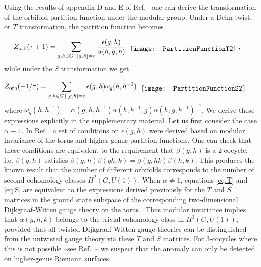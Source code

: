 \documentclass[aps,pra,twocolumn,superscriptaddress,10pt,article,nofootinbib,showpacs]{revtex4-1}
\begin{document}
Using the results of appendix D and E of Ref.~\cite{SPTpaper} one can derive the transformation of the orbifold partition function under the modular group. Under a Dehn twist, or $T$ transformation, the partition function becomes

\begin{align}\label{eq:T}
Z_{\text{orb}}(\tau +1)=\sum_{g,h\in G\, |\,[g,h]=e} \frac{\epsilon(g,h)}{\alpha(h,g,h)}
 & \hspace{2 mm} \raisebox{-.4\height}{\texttt{[image: PartitionFunctionT2]}}\; ,
\end{align}
while under the $S$ transformation we get

\begin{align}\label{eq:S}
Z_{\text{orb}}(-1/\tau)=\sum_{g,h\in G\, |\,[g,h]=e} \epsilon(g,h)\omega_g(h,h^{-1})
 & \hspace{2 mm} \raisebox{-.4\height}{\texttt{[image: PartitionFunctionS2]}}\; ,
\end{align}
where $\omega_g(h,h^{-1})=\alpha(g,h,h^{-1})\alpha(h,h^{-1},g)\alpha(h,g,h^{-1})^{-1}$. We derive these expressions explicitly in the supplementary material. Let us first consider the case $\alpha \equiv 1$. In Ref.~\cite{Vafa1} a set of conditions on $\epsilon(g,h)$ were derived based on modular invariance of the torus and higher genus partition functions. One can check that these conditions are equivalent to the requirement that $\beta(g,h)$ is a 2-cocycle, i.e. $\beta(g,h)$ satisfies $\beta(g,h)\beta(gh,k)=\beta(g,hk)\beta(h,k)$. This produces the known result that the number of different orbifolds corresponds to the number of second cohomology classes $H^2(G,U(1))$. When $\alpha\neq 1$, equations \eqref{eq:T} and \eqref{eq:S} are equivalent to the expressions derived previously for the $T$ and $S$ matrices in the ground state subspace of the corresponding two-dimensional Dijkgraaf-Witten gauge theory on the torus \cite{DijkgraafWitten,HuWan}. Thus modular invariance implies that $\alpha(g,h,k)$ belongs to the trivial cohomology class in $H^3(G,U(1))$, provided that all twisted Dijkgraaf-Witten gauge theories can be distinguished from the untwisted gauge theory via these $T$ and $S$ matrices. For 3-cocycles where this is not possible --see Ref.~\cite{Mignard}-- we suspect that the anomaly can only be detected on higher-genus Riemann surfaces.
\end{document}
